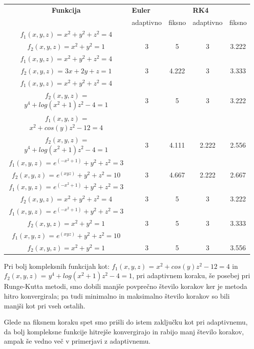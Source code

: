 \documentclass[12pt]{article}
\begin{document}
\begin{tabular}{|c | c | c | c | c |} 
 \hline
 \textbf{Funkcija} &\multicolumn{2}{|l|}{\textbf{Euler}} &\multicolumn{2}{|l|}{\textbf{RK4}}\\                
  \small &adaptivno & fiksno & adaptivno & fiksno \\ 
 \hline
 \small{}$f_{1}(x,y,z)=x^{2} + y^{2}+ z^{2}=4$ & & & &\\ 
 \small{}$f_{2}(x,y,z)=x^{2} + y^{2}    =1$  & 3 & 5 & 3 & 3.222 \\
 \hline
 \small{}$f_{1}(x,y,z)=x^{2} + y^{2}+ z^{2}=4$ & & & &\\ 
 \small{}$f_{2}(x,y,z)$ = $3x + 2y + z = 1$  & 3 & 4.222 & 3 & 3.333 \\
 \hline
 \small{}$f_{1}(x,y,z)=x^{2} + y^{2}+ z^{2}=4$ & & & &\\ 
 \small{}$f_{2}(x,y,z)$ = $y^4 + log(x^2 + 1)z^2 - 4 = 1$  & 3 & 5 & 3 & 3.222 \\
 \hline
 \small{}$f_{1}(x,y,z)$ = $x^2 + cos(y)z^2 - 12 = 4$ & & & &\\ 
\small{}$f_{2}(x,y,z)$ = $y^4 + log(x^2 + 1)z^2 - 4 = 1$  & 3 & 4.111 & 2.222 & 2.556 \\
 \hline
 \small{}$f_{1}(x,y,z)$ = $e^{(-x^{2}+1)}+y^{2}+z^{2} = 3$ & & & &\\ 
 \small{}$f_{2}(x,y,z)$ = $e^{(xyz)}+y^{2}+z^{2} = 10$  & 3 & 4.667 & 2.222 & 2.667 \\
 \hline
 \small{}$f_{1}(x,y,z)$ = $e^{(-x^{2}+1)}+y^{2}+z^{2} = 3$ & & & &\\ 
 \small{}$f_{2}(x,y,z)=x^{2} + y^{2}+ z^{2}=4$  & 3 & 5 & 3 & 3.222 \\
 \hline
 \small{}$f_{1}(x,y,z)$ = $e^{(-x^{2}+1)}+y^{2}+z^{2} = 3$ & & & &\\ 
  \small{}$f_{2}(x,y,z)=x^{2} + y^{2}    =1$  & 3 & 5 & 3 & 3.333 \\
  \hline
\small{}$f_{1}(x,y,z)$ = $e^{(xyz)}+y^{2}+z^{2} = 10$ & & & &\\ 
 \small{}$f_{2}(x,y,z)=x^{2} + y^{2}    =1$  & 3 & 5 & 3 & 3.556 \\
  \hline
\end{tabular} \par

Pri bolj kompleksnih funkcijah kot: $f_{1}(x,y,z)$ = $x^2 + cos(y)z^2 - 12 = 4$  in $f_{2}(x,y,z)$ = $y^4 + log(x^2 + 1)z^2 - 4 = 1$, pri adaptivnem koraku, \v{s}e posebej pri Runge-Kutta metodi, smo dobili manj\v{s}e povpre\v{c}no \v{s}tevilo korakov ker je metoda hitro konvergirala; pa tudi minimalno in maksimalno \v{s}tevilo korakov so bili manj\v{s}i kot pri vseh ostalih.\par
Glede na fiksnem koraku spet smo pri\v{s}li do istem zaklju\v{c}ku kot pri adaptivnemu, da bolj kompleksne funkcije hitrej\v{s}e konvergirajo in rabijo manj \v{s}tevilo korakov, ampak \v{s}e vedno ve\v{c} v primerjavi z adaptivnemu. 
\end{document}
